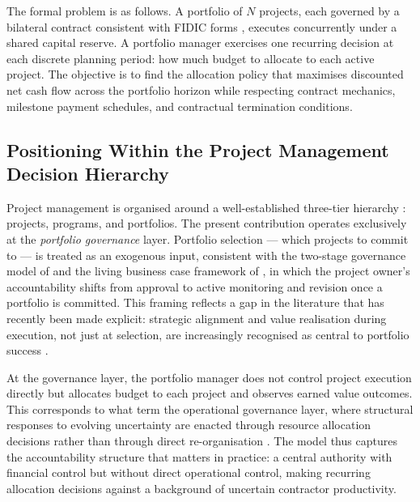 The formal problem is as follows. A portfolio of $N$ projects, each
governed by a bilateral contract consistent with FIDIC forms
\citep{FIDIC2017}, executes concurrently under a shared capital
reserve. A portfolio manager exercises one recurring decision at each
discrete planning period: how much budget to allocate to each active
project. The objective is to find the allocation policy that maximises
discounted net cash flow across the portfolio horizon while respecting
contract mechanics, milestone payment schedules, and contractual
termination conditions.

\subsection{Positioning Within the Project Management Decision Hierarchy}
\label{subsec:hierarchy}

Project management is organised around a well-established three-tier
hierarchy \citep{PMI2017}: projects, programs, and portfolios.
The present contribution operates exclusively at the \emph{portfolio
governance} layer. Portfolio selection --- which projects to commit to
--- is treated as an exogenous input, consistent with the two-stage
governance model of \citet{Turner2014} and the living business case
framework of \citet{Zwikael2026}, in which the project owner's
accountability shifts from approval to active monitoring and revision
once a portfolio is committed. This framing reflects a gap in the
literature that has recently been made explicit: strategic alignment and
value realisation during execution, not just at selection, are
increasingly recognised as central to portfolio success
\citep{Zwikael2026, Jiang2026}.

At the governance layer, the portfolio manager does not control project
execution directly but allocates budget to each project and observes
earned value outcomes. This corresponds to what \citet{Jiang2026} term
the operational governance layer, where structural responses to evolving
uncertainty are enacted through resource allocation decisions rather
than through direct re-organisation \citep{Luan2026}. The model thus
captures the accountability structure that matters in practice: a
central authority with financial control but without direct operational
control, making recurring allocation decisions against a background of
uncertain contractor productivity.

